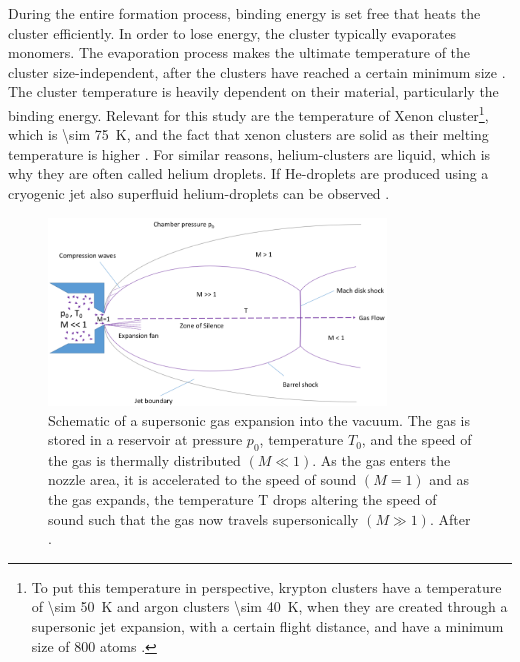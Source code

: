 During the entire formation process, binding energy is set free that heats the cluster efficiently. In order to lose energy, the cluster typically evaporates monomers. The evaporation process makes the ultimate temperature of the cluster size-independent, after the clusters have reached a certain minimum size \citep{Farges-1981-SurfSci}.
The cluster temperature is heavily dependent on their material, particularly the binding energy. Relevant for this study are the temperature of Xenon cluster\footnote{To put this temperature in perspective, krypton clusters have a temperature of \SI{\sim 50}{\kelvin} and argon clusters \SI{\sim 40}{\kelvin}, when they are created through a supersonic jet expansion, with a certain flight distance, and have a minimum size of 800 atoms \citep{Farges-1981-SurfSci,Gspann-1986-Springer}.}, which is \SI{\sim 75}{\kelvin}, and the fact that xenon clusters are solid as their melting temperature is higher \citep{Gspann-1986-Springer}. For similar reasons, helium-clusters are liquid, which is why they are often called helium droplets. If He-droplets are produced using a cryogenic jet also superfluid helium-droplets can be observed \citep{Gomez-2011-JCP}.\\[1\baselineskip]
%
\begin{figure}
	\centering
		\includegraphics[width=0.80\textwidth]{images/freeJetExpansion.png}
	\caption[Schematic of a supersonic gas expansion into a vacuum.]{Schematic of a supersonic gas expansion into the vacuum. The gas is stored in a reservoir at pressure $p_{0}$, temperature $T_{0}$, and the speed of the gas is thermally distributed $\left(M\ll 1\right)$. As the gas enters the nozzle area, it is accelerated to the speed of sound $\left(M=1\right)$ and as the gas expands, the temperature T drops altering the speed of sound such that the gas now travels supersonically $\left(M\gg 1\right)$. After \citep{Miller-1988-Oxford}.}
	\label{fig:freeJetExpansion}
\end{figure}
